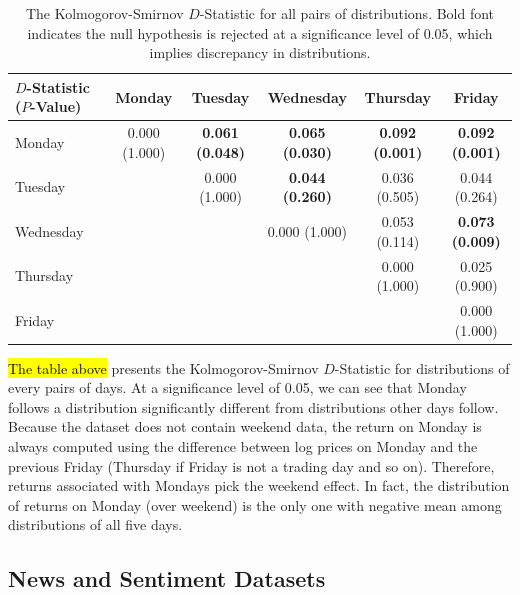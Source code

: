 \documentclass[12pt]{article}
\begin{document}
	\begin{table}[H]
		\small
		\center
		\begin{tabular}{|l|c|c|c|c|c|}
			\hline
			$D$-Statistic ($P$-Value)& Monday & Tuesday & Wednesday & Thursday & Friday \\
			\hline 
			Monday    & 0.000 (1.000) & \textbf{0.061 (0.048)} & \textbf{0.065 (0.030)} & \textbf{0.092 (0.001)} & \textbf{0.092 (0.001)} \\
			Tuesday   &               & 0.000 (1.000) & \textbf{0.044 (0.260)} & 0.036 (0.505) & 0.044 (0.264) \\
			Wednesday &               &               & 0.000 (1.000) & 0.053 (0.114) & \textbf{0.073 (0.009)} \\
			Thursday  &               &               &               & 0.000 (1.000) & 0.025 (0.900) \\
			Friday    &               &               &               &               & 0.000 (1.000) \\
			\hline
		\end{tabular}
		\caption{The Kolmogorov-Smirnov $D$-Statistic for all pairs of distributions. Bold font indicates the null hypothesis is rejected at a significance level of 0.05, which implies discrepancy in distributions.}
	\end{table}
	\hl{The table above} presents the Kolmogorov-Smirnov $D$-Statistic for distributions of every pairs of days. At a significance level of 0.05, we can see that Monday follows a distribution significantly different from distributions other days follow. Because the dataset does not contain weekend data, the return on Monday is always computed using the difference between log prices on Monday and the previous Friday (Thursday if Friday is not a trading day and so on). Therefore, returns associated with Mondays pick the weekend effect. In fact, the distribution of returns on Monday (over weekend) is the only one with negative mean among distributions of all five days.

	\subsection{News and Sentiment Datasets}
\end{document}
